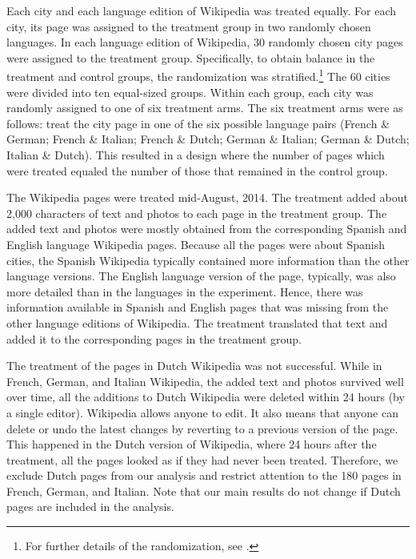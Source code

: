 \documentclass[12pt]{article}
\begin{document}
Each city and each language edition of Wikipedia was treated equally. For each city, its page was assigned to the treatment group in two randomly chosen languages. In each language edition of Wikipedia, 30 randomly chosen city pages were assigned to the treatment group. Specifically, to obtain balance in the treatment and control groups, the randomization was stratified.\footnote{For further details of the randomization, see \cite{hinnosaar2017wikipedia}.}
The 60 cities were divided into ten equal-sized groups. Within each group, each city was randomly assigned to one of six treatment arms. The six treatment arms were as follows: treat the city page in one of the six possible language pairs (French \& German; French \& Italian; French \& Dutch; German \& Italian; German \& Dutch; Italian \& Dutch). This resulted in a design where the number of pages which were treated equaled the number of those that remained in the control group.

The Wikipedia pages were treated mid-August, 2014. The treatment added about 2,000 characters of text and photos to each page in the treatment group. The added text and photos were mostly obtained from the corresponding Spanish and English language Wikipedia pages. Because all the pages were about Spanish cities, the Spanish Wikipedia typically contained more information than the other language versions. The English language version of the page, typically, was also more detailed than in the languages in the experiment. Hence, there was information available in Spanish and English pages that was missing from the other language editions of Wikipedia. The treatment translated that text and added it to the corresponding pages in the treatment group.

The treatment of the pages in Dutch Wikipedia was not successful. While in French, German, and Italian Wikipedia, the added text and photos survived well over time, all the additions to Dutch Wikipedia were deleted within 24 hours (by a single editor). Wikipedia allows anyone to edit. It also means that anyone can delete or undo the latest changes by reverting to a previous version of the page. This happened in the Dutch version of Wikipedia, where 24 hours after the treatment, all the pages looked as if they had never been treated. Therefore, we exclude Dutch pages from our analysis and restrict attention to the 180 pages in French, German, and Italian. Note that our main results do not change if Dutch pages are included in the analysis.
\end{document}
